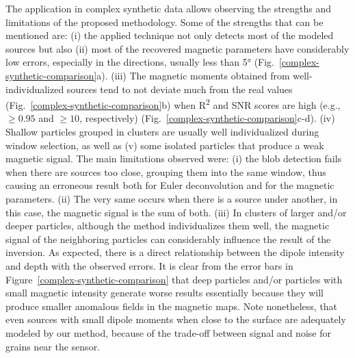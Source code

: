 The application in complex synthetic data allows observing the strengths and limitations of the proposed methodology. Some of the strengths that can be mentioned are: (i) the applied technique not only detects most of the modeled sources but also (ii) most of the recovered magnetic parameters have considerably low errors, especially in the directions, usually less than 5° (Fig.~\ref{complex-synthetic-comparison}a). (iii) The magnetic moments obtained from well-individualized sources tend to not deviate much from the real values (Fig.~\ref{complex-synthetic-comparison}b) when R\textsuperscript{2} and SNR scores are high (e.g., $\geq 0.95$ and $\geq 10$, respectively) (Fig.~\ref{complex-synthetic-comparison}c-d). (iv) Shallow particles grouped in clusters are usually well individualized during window selection, as well as (v) some isolated particles that produce a weak magnetic signal. The main limitations observed were: (i) the blob detection fails when there are sources too close, grouping them into the same window, thus causing an erroneous result both for Euler deconvolution and for the magnetic parameters. (ii) The very same occurs when there is a source under another, in this case, the magnetic signal is the sum of both. (iii) In clusters of larger and/or deeper particles, although the method individualizes them well, the magnetic signal of the neighboring particles can considerably influence the result of the inversion. As expected, there is a direct relationship between the dipole intensity and depth with the observed errors. It is clear from the error bars in Figure~\ref{complex-synthetic-comparison} that deep particles and/or particles with small magnetic intensity generate worse results essentially because they will produce smaller anomalous fields in the magnetic maps. Note nonetheless, that even sources with small dipole moments when close to the surface are adequately modeled by our method, because of the trade-off between signal and noise for grains near the sensor.

